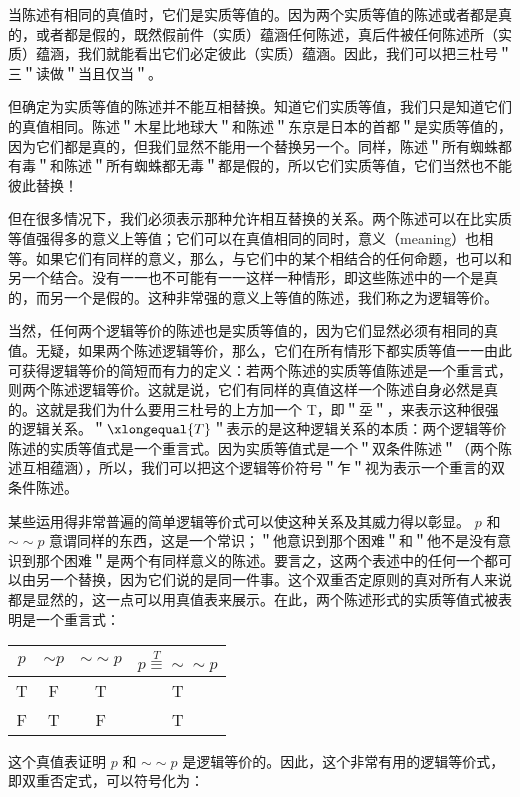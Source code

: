 当陈述有相同的真值时，它们是实质等值的。因为两个实质等值的陈述或者都是真的，或者都是假的，既然假前件（实质）蕴涵任何陈述，真后件被任何陈述所（实质）蕴涵，我们就能看出它们必定彼此（实质）蕴涵。因此，我们可以把三杜号＂三＂读做＂当且仅当＂。

但确定为实质等值的陈述并不能互相替换。知道它们实质等值，我们只是知道它们的真值相同。陈述＂木星比地球大＂和陈述＂东京是日本的首都＂是实质等值的，因为它们都是真的，但我们显然不能用一个替换另一个。同样，陈述＂所有蜘蛛都有毒＂和陈述＂所有蜘蛛都无毒＂都是假的，所以它们实质等值，它们当然也不能彼此替换！

但在很多情况下，我们必须表示那种允许相互替换的关系。两个陈述可以在比实质等值强得多的意义上等值；它们可以在真值相同的同时，意义（meaning）也相等。如果它们有同样的意义，那么，与它们中的某个相结合的任何命题，也可以和另一个结合。没有一一也不可能有一一这样一种情形，即这些陈述中的一个是真的，而另一个是假的。这种非常强的意义上等值的陈述，我们称之为逻辑等价。

当然，任何两个逻辑等价的陈述也是实质等值的，因为它们显然必须有相同的真值。无疑，如果两个陈述逻辑等价，那么，它们在所有情形下都实质等值一一由此可获得逻辑等价的简短而有力的定义：若两个陈述的实质等值陈述是一个重言式，则两个陈述逻辑等价。这就是说，它们有同样的真值这样一个陈述自身必然是真的。这就是我们为什么要用三杜号的上方加一个 T，即＂坖＂，来表示这种很强的逻辑关系。＂$\xlongequal{T}$＂表示的是这种逻辑关系的本质：两个逻辑等价陈述的实质等值式是一个重言式。因为实质等值式是一个＂双条件陈述＂（两个陈述互相蕴涵），所以，我们可以把这个逻辑等价符号＂乍＂视为表示一个重言的双条件陈述。

某些运用得非常普遍的简单逻辑等价式可以使这种关系及其威力得以彰显。 $p$ 和 $\sim \sim p$ 意谓同样的东西，这是一个常识；＂他意识到那个困难＂和＂他不是没有意识到那个困难＂是两个有同样意义的陈述。要言之，这两个表述中的任何一个都可以由另一个替换，因为它们说的是同一件事。这个双重否定原则的真对所有人来说都是显然的，这一点可以用真值表来展示。在此，两个陈述形式的实质等值式被表明是一个重言式：

\begin{center}
\begin{tabular}{|cccc|}
\hline
$p$ & $\sim p$ & $\sim \sim p$ & $p \stackrel{T}{\equiv} \sim \sim p$ \\
\hline
T & F & T & T \\
F & T & F & T \\
\hline
\end{tabular}
\end{center}

这个真值表证明 $p$ 和 $\sim \sim p$ 是逻辑等价的。因此，这个非常有用的逻辑等价式，即双重否定式，可以符号化为：

